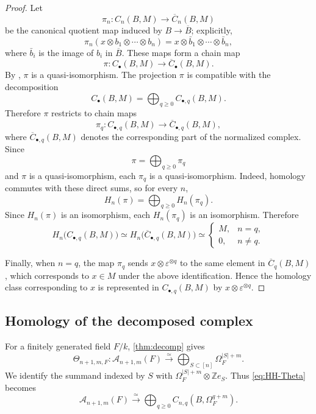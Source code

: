 \documentclass[a4paper,12pt,reqno]{amsart}
\numberwithin{equation}{section}
\theoremstyle{definition}
\newcommand{\Z}{\mathbb{Z}}
\newcommand{\Acal}{\mathcal{A}}
\begin{document}
\begin{proof}
Let
\[
 \pi_n:C_n(B,M)\to\overline C_n(B,M)
\]
be the canonical quotient map induced by $B\to\overline B$; explicitly,
\[
 \pi_n(x\otimes b_1\otimes\cdots\otimes b_n)
 =
 x\otimes\bar b_1\otimes\cdots\otimes\bar b_n, 
\]
where $\bar b_i$ is the image of $b_i$ in $\overline B$. 
These maps form a chain map
\[
 \pi:C_\bullet(B,M)\to\overline C_\bullet(B,M).
\]
By \cite[Proposition~1.1.15]{Lod98}, $\pi$ is a quasi-isomorphism. 
The projection $\pi$ is compatible with the decomposition
\[
 C_\bullet(B,M)
 =
 \bigoplus_{q\geq0}C_{\bullet,q}(B,M).
\]
Therefore $\pi$ restricts to chain maps
\[
 \pi_q:
 C_{\bullet,q}(B,M)
 \to
 \overline C_{\bullet,q}(B,M),
\]
where $\overline C_{\bullet,q}(B,M)$ denotes the corresponding part of
the normalized complex.
Since
\[
 \pi=\bigoplus_{q\geq0}\pi_q
\]
and $\pi$ is a quasi-isomorphism, each $\pi_q$ is a quasi-isomorphism.
Indeed, homology commutes with these direct sums, so for every $n$,
\[
 H_n(\pi)
 =
 \bigoplus_{q\geq0}H_n(\pi_q).
\]
Since $H_n(\pi)$ is an isomorphism, each $H_n(\pi_q)$ is an
isomorphism. 
 Therefore
\[
 H_n\bigl(C_{\bullet,q}(B,M)\bigr)
 \simeq
 H_n\bigl(\overline C_{\bullet,q}(B,M)\bigr)
 \simeq
 \begin{cases}
  M,&n=q,\\
  0,&n\neq q.
 \end{cases}
\]

Finally, when $n=q$, the map $\pi_q$ sends
$x\otimes\varepsilon^{\otimes q}$ 
to the same element in $\overline C_q(B,M)$, which corresponds to
$x\in M$ under the above identification.  Hence the homology class
corresponding to $x$ is represented in $C_{\bullet,q}(B,M)$ by
$x\otimes\varepsilon^{\otimes q}$.
\end{proof}




\subsection{Homology of the decomposed complex}

For a finitely generated field $F/k$, \autoref{thm:decomp} gives
\begin{equation}\label{eq:HH-Theta}
 \Theta_{n+1,m,F}:
 \Acal_{n+1,m}(F)
 \xrightarrow{\simeq}
 \bigoplus_{S\subset[n]}\Omega_F^{|S|+m}.
\end{equation}
We identify the summand indexed by $S$ with
$\Omega_F^{|S|+m}\otimes\Z e_S$.
Thus \eqref{eq:HH-Theta} becomes
\begin{equation}\label{eq:HH-Theta-B}
 \Acal_{n+1,m}(F)
 \xrightarrow{\simeq}
 \bigoplus_{q\geq0}
 C_{n,q}(B,\Omega_F^{q+m}).
\end{equation}
\end{document}
